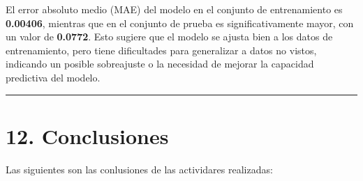 \documentclass[
]{book}
\begin{document}
El error absoluto medio (MAE) del modelo en el conjunto de entrenamiento es \textbf{0.00406}, mientras que en el conjunto de prueba es significativamente mayor, con un valor de \textbf{0.0772}. Esto sugiere que el modelo se ajusta bien a los datos de entrenamiento, pero tiene dificultades para generalizar a datos no vistos, indicando un posible sobreajuste o la necesidad de mejorar la capacidad predictiva del modelo.

\begin{center}\rule{0.5\linewidth}{0.5pt}\end{center}

\section{12. Conclusiones}\label{conclusiones-1}

Las siguientes son las conlusiones de las actividares realizadas:
\end{document}
